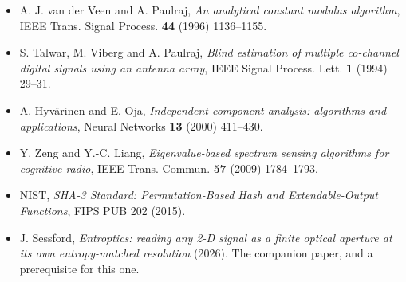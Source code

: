 \documentclass[10pt,letterpaper,twocolumn]{article}
\providecommand{\tightlist}{\setlength{\itemsep}{0pt}\setlength{\parskip}{0pt}}
\begin{document}
\begin{itemize}
\tightlist
\item
  A. J. van der Veen and A. Paulraj, \emph{An analytical constant modulus algorithm}, IEEE Trans. Signal Process. \textbf{44} (1996) 1136--1155.
\item
  S. Talwar, M. Viberg and A. Paulraj, \emph{Blind estimation of multiple co-channel digital signals using an antenna array}, IEEE Signal Process. Lett. \textbf{1} (1994) 29--31.
\item
  A. Hyvärinen and E. Oja, \emph{Independent component analysis: algorithms and applications}, Neural Networks \textbf{13} (2000) 411--430.
\item
  Y. Zeng and Y.-C. Liang, \emph{Eigenvalue-based spectrum sensing algorithms for cognitive radio}, IEEE Trans. Commun. \textbf{57} (2009) 1784--1793.
\item
  NIST, \emph{SHA-3 Standard: Permutation-Based Hash and Extendable-Output Functions}, FIPS PUB 202 (2015).
\item
  J. Sessford, \emph{Entroptics: reading any 2-D signal as a finite optical aperture at its own entropy-matched resolution} (2026). The companion paper, and a prerequisite for this one.
\end{itemize}
\end{document}
